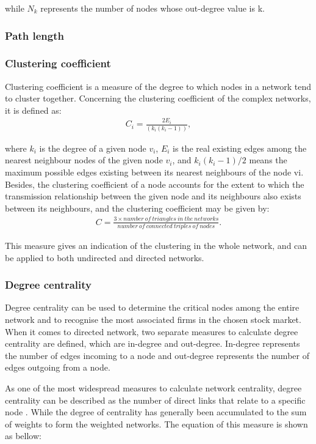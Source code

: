 while $N_k$ represents the number of nodes whose out-degree value is k.

\subsubsection{Path length}

\subsubsection{Clustering coefficient} %
Clustering coefficient is a measure of the degree to which nodes in a network tend to cluster together. Concerning the clustering coefficient of the complex networks, it is defined as:
\begin{eqnarray}
C_i=\frac{2E_i}{(k_i(k_i-1))},
\end{eqnarray}

where $k_i$ is the degree of a given node $v_i$, $E_i$ is the real existing edges among the nearest neighbour nodes of the given node $v_i$, and $k_i(k_i-1)/2$ means the maximum possible edges existing between its nearest neighbours of the node vi. Besides, the clustering coefficient of a node accounts for the extent to which the transmission relationship between the given node and its neighbours also exists between its neighbours, and the clustering coefficient may be given by:
\begin{eqnarray}
C=\frac{3\times number\ of\ triangles\ in\ the\ networks}{number\ of\ connected\ triples\ of\ nodes}.
\end{eqnarray}

This measure gives an indication of the clustering in the whole network, and can be applied to both undirected and directed networks.

\subsubsection{Degree centrality}
Degree centrality can be used to determine the critical nodes among the entire network and to recognise the most associated firms in the chosen stock market. When it comes to directed network, two separate measures to calculate degree centrality are defined, which are in-degree and out-degree. In-degree represents the number of edges incoming to a node and out-degree represents the number of edges outgoing from a node.

As one of the most widespread measures to calculate network centrality, degree centrality can be described as the number of direct links that relate to a specific node \cite{freeman}. While the degree of centrality has generally been accumulated to the sum of weights to form the weighted networks. The equation of this measure is shown as bellow:


